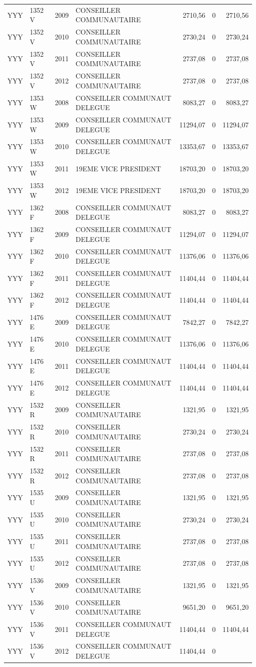 \begin{longtable}[]{@{}llrlrrr@{}}
YYY & 1352 V & 2009 & CONSEILLER COMMUNAUTAIRE & 2710,56 & 0 &
2710,56\tabularnewline
YYY & 1352 V & 2010 & CONSEILLER COMMUNAUTAIRE & 2730,24 & 0 &
2730,24\tabularnewline
YYY & 1352 V & 2011 & CONSEILLER COMMUNAUTAIRE & 2737,08 & 0 &
2737,08\tabularnewline
YYY & 1352 V & 2012 & CONSEILLER COMMUNAUTAIRE & 2737,08 & 0 &
2737,08\tabularnewline
YYY & 1353 W & 2008 & CONSEILLER COMMUNAUT DELEGUE & 8083,27 & 0 &
8083,27\tabularnewline
YYY & 1353 W & 2009 & CONSEILLER COMMUNAUT DELEGUE & 11294,07 & 0 &
11294,07\tabularnewline
YYY & 1353 W & 2010 & CONSEILLER COMMUNAUT DELEGUE & 13353,67 & 0 &
13353,67\tabularnewline
YYY & 1353 W & 2011 & 19EME VICE PRESIDENT & 18703,20 & 0 &
18703,20\tabularnewline
YYY & 1353 W & 2012 & 19EME VICE PRESIDENT & 18703,20 & 0 &
18703,20\tabularnewline
YYY & 1362 F & 2008 & CONSEILLER COMMUNAUT DELEGUE & 8083,27 & 0 &
8083,27\tabularnewline
YYY & 1362 F & 2009 & CONSEILLER COMMUNAUT DELEGUE & 11294,07 & 0 &
11294,07\tabularnewline
YYY & 1362 F & 2010 & CONSEILLER COMMUNAUT DELEGUE & 11376,06 & 0 &
11376,06\tabularnewline
YYY & 1362 F & 2011 & CONSEILLER COMMUNAUT DELEGUE & 11404,44 & 0 &
11404,44\tabularnewline
YYY & 1362 F & 2012 & CONSEILLER COMMUNAUT DELEGUE & 11404,44 & 0 &
11404,44\tabularnewline
YYY & 1476 E & 2009 & CONSEILLER COMMUNAUT DELEGUE & 7842,27 & 0 &
7842,27\tabularnewline
YYY & 1476 E & 2010 & CONSEILLER COMMUNAUT DELEGUE & 11376,06 & 0 &
11376,06\tabularnewline
YYY & 1476 E & 2011 & CONSEILLER COMMUNAUT DELEGUE & 11404,44 & 0 &
11404,44\tabularnewline
YYY & 1476 E & 2012 & CONSEILLER COMMUNAUT DELEGUE & 11404,44 & 0 &
11404,44\tabularnewline
YYY & 1532 R & 2009 & CONSEILLER COMMUNAUTAIRE & 1321,95 & 0 &
1321,95\tabularnewline
YYY & 1532 R & 2010 & CONSEILLER COMMUNAUTAIRE & 2730,24 & 0 &
2730,24\tabularnewline
YYY & 1532 R & 2011 & CONSEILLER COMMUNAUTAIRE & 2737,08 & 0 &
2737,08\tabularnewline
YYY & 1532 R & 2012 & CONSEILLER COMMUNAUTAIRE & 2737,08 & 0 &
2737,08\tabularnewline
YYY & 1535 U & 2009 & CONSEILLER COMMUNAUTAIRE & 1321,95 & 0 &
1321,95\tabularnewline
YYY & 1535 U & 2010 & CONSEILLER COMMUNAUTAIRE & 2730,24 & 0 &
2730,24\tabularnewline
YYY & 1535 U & 2011 & CONSEILLER COMMUNAUTAIRE & 2737,08 & 0 &
2737,08\tabularnewline
YYY & 1535 U & 2012 & CONSEILLER COMMUNAUTAIRE & 2737,08 & 0 &
2737,08\tabularnewline
YYY & 1536 V & 2009 & CONSEILLER COMMUNAUTAIRE & 1321,95 & 0 &
1321,95\tabularnewline
YYY & 1536 V & 2010 & CONSEILLER COMMUNAUTAIRE & 9651,20 & 0 &
9651,20\tabularnewline
YYY & 1536 V & 2011 & CONSEILLER COMMUNAUT DELEGUE & 11404,44 & 0 &
11404,44\tabularnewline
YYY & 1536 V & 2012 & CONSEILLER COMMUNAUT DELEGUE & 11404,44 & 0 &

\end{longtable}
